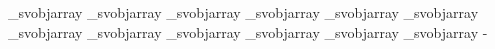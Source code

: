 {{{        \advance\cntf\@ne
      \fi
      \advance\indexa\cntDeltaEE
      \ifcase\fontdimen\indexa\_svobjarray
        \advance\cntf\@ne
      \fi
      \advance\indexa\cntDeltaEF
      \ifcase\fontdimen\indexa\_svobjarray
        \advance\cntf\@ne
      \fi
      \advance\indexa\cntDeltaEG
      \ifcase\fontdimen\indexa\_svobjarray
        \advance\cntf\@ne
      \fi
      \advance\indexa\cntDeltaEH
      \ifcase\fontdimen\indexa\_svobjarray
        \advance\cntf\@ne
      \fi
      \advance\indexa\cntDeltaFA
      \ifcase\fontdimen\indexa\_svobjarray
        \advance\cntf\@ne
      \fi
      \advance\indexa\cntDeltaFB
      \ifcase\fontdimen\indexa\_svobjarray
        \advance\cntf\@ne
      \fi
      \advance\indexa\cntDeltaFC
      \ifcase\fontdimen\indexa\_svobjarray
        \advance\cntf\@ne
      \fi
      \advance\indexa\cntDeltaFD
      \ifcase\fontdimen\indexa\_svobjarray
        \advance\cntf\@ne
      \fi
      \advance\indexa\cntDeltaFE
      \ifcase\fontdimen\indexa\_svobjarray
        \advance\cntf\@ne
      \fi
      \advance\indexa\cntDeltaFF
      \ifcase\fontdimen\indexa\_svobjarray
        \advance\cntf\@ne
      \fi
      \advance\indexa\cntDeltaFG
      \ifcase\fontdimen\indexa\_svobjarray
        \advance\cntf\@ne
      \fi
      \advance\indexa\cntDeltaFH
      \ifcase\fontdimen\indexa\_svobjarray
        \advance\cntf\@ne
      \fi
     }%
    }%
    \multiply\cntb\onethousandeight
    \advance\cntd-\cntb %
    \cntb\cntd
    \divide\cntb\wheelcogcount
    }
